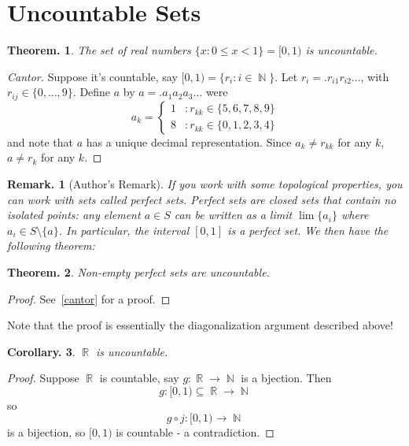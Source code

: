 \documentclass[11pt, a4paper]{memoir}
\DeclareMathOperator{\N}{{\mathbb{N}}}
\DeclareMathOperator{\R}{{\mathbb{R}}}
\theoremstyle{change}
\newtheorem{theorem}{Theorem.}[section]
\newtheorem{corollary}[theorem]{Corollary.}
\theoremstyle{plain}
\theoremstyle{nonumberplain}
\newtheorem{remark}{Remark.}
\newtheorem{proof}{Proof}
\numberwithin{equation}{section}
\begin{document}
\section{Uncountable Sets}
\begin{theorem}
    The set of real numbers $\{x:0\leq x<1\}=[0,1)$ is uncountable.
\end{theorem}
\begin{proof}[Cantor]
    Suppose it's countable, say $[0,1)=\{r_i:i\in\N\}$. Let $r_i=.r_{i1}r_{i2}\ldots$, with $r_{ij}\in\{0,\ldots,9\}$.
    Define $a$ by $a=.a_1a_2a_3\ldots$ were
    \[a_k=
    \begin{cases}
        1 &: r_{kk}\in\{5,6,7,8,9\}\\
        8 &: r_{kk}\in\{0,1,2,3,4\}
    \end{cases}
    \]
    and note that $a$ has a unique decimal representation. Since $a_k\neq r_{kk}$ for any $k$, $a\neq r_k$ for any $k$.
\end{proof}
\begin{remark}[Author's Remark]
    If you work with some topological properties, you can work with sets called \textit{perfect sets}. Perfect sets
    are closed sets that contain no isolated points: any element $a\in S$ can be written as a limit $\lim\{a_i\}$
    where $a_i\in S\setminus\{a\}$. In particular, the interval $[0,1]$ is a perfect set. We then have the following
    theorem:
\end{remark}
\begin{theorem}
    Non-empty perfect sets are uncountable.
\end{theorem}
\begin{proof}
    See~\ref{cantor} for a proof.
\end{proof}
Note that the proof is essentially the diagonalization argument described above!
\begin{corollary}
    $\R$ is uncountable.
\end{corollary}
\begin{proof}
    Suppose $\R$ is countable, say $g:\R\to\N$ is a bjection. Then
    \[ g:[0,1)\subseteq\R\to\N\]
    so
    \[g\circ j:[0,1)\to\N\]
    is a bijection, so $[0,1)$ is countable - a contradiction.
\end{proof}
\end{document}
